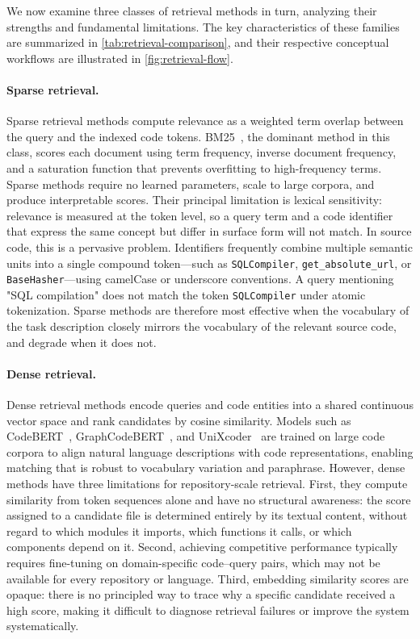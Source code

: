We now examine three classes of retrieval methods in turn, analyzing their strengths and fundamental limitations.
The key characteristics of these families are summarized in \cref{tab:retrieval-comparison}, and their respective conceptual workflows are illustrated in \cref{fig:retrieval-flow}.

\paragraph{Sparse retrieval.}
Sparse retrieval methods compute relevance as a weighted term overlap between the query and the indexed code tokens. BM25~\cite{bm25}, the dominant method in this class, scores each document using term frequency, inverse document frequency, and a saturation function that prevents overfitting to high-frequency terms. Sparse methods require no learned parameters, scale to large corpora, and produce interpretable scores. Their principal limitation is lexical sensitivity: relevance is measured at the token level, so a query term and a code identifier that express the same concept but differ in surface form will not match. In source code, this is a pervasive problem. Identifiers frequently combine multiple semantic units into a single compound token---such as \texttt{SQLCompiler}, \texttt{get\_absolute\_url}, or \texttt{BaseHasher}---using camelCase or underscore conventions. A query mentioning "SQL compilation" does not match the token \texttt{SQLCompiler} under atomic tokenization. Sparse methods are therefore most effective when the vocabulary of the task description closely mirrors the vocabulary of the relevant source code, and degrade when it does not.

\paragraph{Dense retrieval.}
Dense retrieval methods encode queries and code entities into a shared continuous vector space and rank candidates by cosine similarity. Models such as CodeBERT~\cite{codebert}, GraphCodeBERT~\cite{graphcodebert}, and UniXcoder~\cite{unixcoder} are trained on large code corpora to align natural language descriptions with code representations, enabling matching that is robust to vocabulary variation and paraphrase. However, dense methods have three limitations for repository-scale retrieval. First, they compute similarity from token sequences alone and have no structural awareness: the score assigned to a candidate file is determined entirely by its textual content, without regard to which modules it imports, which functions it calls, or which components depend on it. Second, achieving competitive performance typically requires fine-tuning on domain-specific code--query pairs, which may not be available for every repository or language. Third, embedding similarity scores are opaque: there is no principled way to trace why a specific candidate received a high score, making it difficult to diagnose retrieval failures or improve the system systematically.

